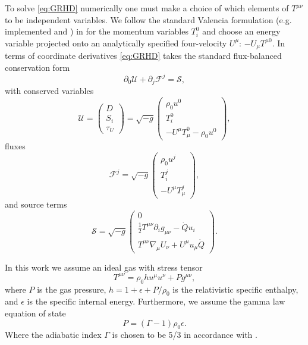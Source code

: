 \documentclass{emulateapj}
\newcommand{\Gam}{\Gamma}
\newcommand{\eps}{\epsilon}
\newcommand{\pd}{\partial}
\begin{document}
To solve \eqref{eq:GRHD} numerically one must make a choice of which elements of $T^{\mu\nu}$ to be independent variables.  We follow the standard Valencia formulation \citep{Marti91, Banyuls97} (e.g. implemented \cite{HARM} and \cite{Duez05}) in  for the momentum variables $T^0_i$ and choose an energy variable projected onto an analytically specified four-velocity $U^\mu$: $-U_\mu T^{\mu 0}$.
In terms of coordinate derivatives \eqref{eq:GRHD} takes the standard flux-balanced conservation form
\begin{equation}
    \pd_0 \mathcal{U} + \pd_j \mathcal{F}^j = \mathcal{S} , \label{eq:consLaw}
\end{equation}
with conserved variables
\begin{equation}
    \mathcal{U} = \begin{pmatrix} D \\
                            S_i \\
                            \tau_U
                \end{pmatrix} = \sqrt{-g} \begin{pmatrix} \rho_0 u^0 \\ 
                                                    T^0_i \\
                                                    -U^\mu T_\mu^0 - \rho_0 u^0 \end{pmatrix} , \label{eq:cons}
\end{equation}
fluxes
\begin{equation}
    \mathcal{F}^j = \sqrt{-g} \begin{pmatrix} \rho_0 u^j \\
                                                T^j_i \\
                                                -U^\mu T_\mu^j \end{pmatrix} ,\label{eq:fluxes}
\end{equation}
and source terms 
\begin{equation}
    \mathcal{S} = \sqrt{-g} \begin{pmatrix} 0 \\
                        \frac{1}{2}T^{\mu\nu}\pd_i g_{\mu\nu} - \dot{Q}u_i \\
                        T^{\mu\nu}\nabla_\mu U_\nu + U^\mu u_\mu \dot{Q} \end{pmatrix} .\label{eq:sources}
\end{equation}

In this work we assume an ideal gas with stress tensor
\begin{equation}
	T^{\mu\nu} = \rho_0 h u^\mu u^\nu + P g^{\mu\nu} ,
\end{equation}
where $P$ is the gas pressure, $h = 1 + \eps + P/\rho_0$ is the relativistic specific enthalpy, and $\eps$ is the specific internal energy. Furthermore, we assume the gamma law equation of state
\begin{equation}
	P = (\Gam - 1) \rho_0 \eps . \label{eq:gammalaw}
\end{equation}
Where the adiabatic index $\Gamma$ is chosen to be 5/3 in accordance with \cite{Farris14}.
\end{document}
